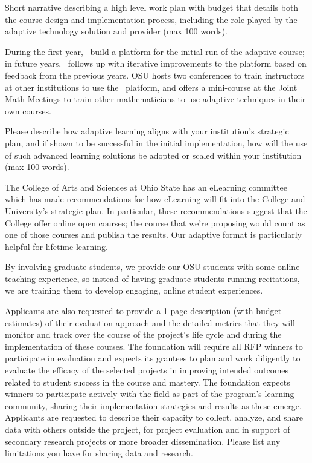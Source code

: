 
\begin{question}
Short narrative describing a high level work plan with budget
that details both the course design and implementation process,
including the role played by the adaptive technology solution and
provider (max 100 words).
\end{question}

During the first year, \gratisu\ build a platform for the initial run
of the adaptive course; in future years, \gratisu\ follows up with
iterative improvements to the platform based on feedback from the
previous years.  OSU hosts two conferences to train instructors at
other institutions to use the \gratisu\ platform, and offers a
mini-course at the Joint Math Meetings to train other mathematicians
to use adaptive techniques in their own courses.

\begin{question}
Please describe how adaptive learning aligns with your
institution’s strategic plan, and if shown to be successful in the
initial implementation, how will the use of such advanced learning
solutions be adopted or scaled within your institution (max 100
words).
\end{question}

The College of Arts and Sciences at Ohio State has an eLearning
committee which has made recommendations for how eLearning will fit
into the College and University's strategic plan.  In particular,
these recommendations suggest that the College offer online open
courses; the course that we're proposing would count as one of those
courses and publish the results.  Our adaptive format is particularly
helpful for lifetime learning.

By involving graduate students, we provide our OSU students with some
online teaching experience, so instead of having graduate students
running recitations, we are training them to develop engaging, online
student experiences.

\begin{question}
Applicants are also requested to provide a 1 page description
(with budget estimates) of their evaluation approach and the
detailed metrics that they will monitor and track over the course of
the project’s life cycle and during the implementation of these
courses. The foundation will require all RFP winners to participate
in evaluation and expects its grantees to plan and work diligently
to evaluate the efficacy of the selected projects in improving
intended outcomes related to student success in the course and
mastery. The foundation expects winners to participate actively with
the field as part of the program’s learning community, sharing their
implementation strategies and results as these emerge. Applicants
are requested to describe their capacity to collect, analyze, and
share data with others outside the project, for project evaluation
and in support of secondary research projects or more broader
dissemination. Please list any limitations you have for sharing data
and research.
\end{question}


